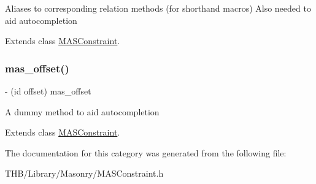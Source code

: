 Aliases to corresponding relation methods (for shorthand macros) Also needed to aid autocompletion 

Extends class \mbox{\hyperlink{interface_m_a_s_constraint_a3a362a9fa62f0adae01eb60b6a8508d1}{M\+A\+S\+Constraint}}.

\mbox{\label{category_m_a_s_constraint_07_autoboxing_support_08_aa1b8cf5bbeff5df1ab0d89fb95d31fe9}} 
\subsubsection{\texorpdfstring{mas\+\_\+offset()}{mas\_offset()}}
{\footnotesize\ttfamily -\/ (id offset) mas\+\_\+offset \begin{DoxyParamCaption}{ }\end{DoxyParamCaption}}

A dummy method to aid autocompletion 

Extends class \mbox{\hyperlink{interface_m_a_s_constraint_aa1b8cf5bbeff5df1ab0d89fb95d31fe9}{M\+A\+S\+Constraint}}.



The documentation for this category was generated from the following file\+:\begin{DoxyCompactItemize}
\item 
T\+H\+B/\+Library/\+Masonry/M\+A\+S\+Constraint.\+h\end{DoxyCompactItemize}
